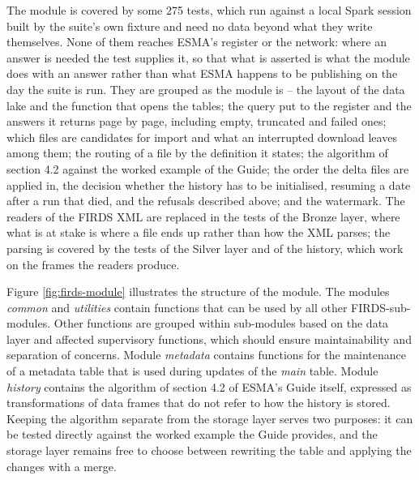 The module is covered by some 275 tests, which run against a local Spark session built by the suite's own fixture and need no data beyond what they write themselves. None of them reaches ESMA's register or the network: where an answer is needed the test supplies it, so that what is asserted is what the module does with an answer rather than what ESMA happens to be publishing on the day the suite is run. They are grouped as the module is -- the layout of the data lake and the function that opens the tables; the query put to the register and the answers it returns page by page, including empty, truncated and failed ones; which files are candidates for import and what an interrupted download leaves among them; the routing of a file by the definition it states; the algorithm of section 4.2 against the worked example of the Guide; the order the delta files are applied in, the decision whether the history has to be initialised, resuming a date after a run that died, and the refusals described above; and the watermark. The readers of the FIRDS XML are replaced in the tests of the Bronze layer, where what is at stake is where a file ends up rather than how the XML parses; the parsing is covered by the tests of the Silver layer and of the history, which work on the frames the readers produce.

Figure \ref{fig:firds-module} illustrates the structure of the module. The modules \emph{common} and \emph{utilities} contain functions that can be used by all other FIRDS-sub-modules. Other functions are grouped within sub-modules based on the data layer and affected supervisory functions, which should ensure maintainability and separation of concerns. Module \emph{metadata} contains functions for the maintenance of a metadata table that is used during updates of the \emph{main} table. Module \emph{history} contains the algorithm of section 4.2 of ESMA's Guide itself, expressed as transformations of data frames that do not refer to how the history is stored. Keeping the algorithm separate from the storage layer serves two purposes: it can be tested directly against the worked example the Guide provides, and the storage layer remains free to choose between rewriting the table and applying the changes with a merge.

